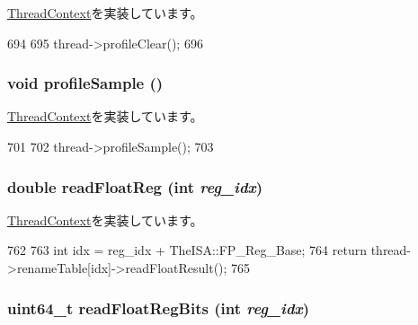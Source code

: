 \hyperlink{classThreadContext_ac9ebb698bd789f38c55af10256aab7e8}{ThreadContext}を実装しています。


\begin{DoxyCode}
694 {
695     thread->profileClear();
696 }
\end{DoxyCode}
\hypertarget{classOzoneCPU_1_1OzoneTC_aba547b904bdcf83196f983f79d285caf}{
\subsubsection[{profileSample}]{\setlength{\rightskip}{0pt plus 5cm}void profileSample ()}}
\label{classOzoneCPU_1_1OzoneTC_aba547b904bdcf83196f983f79d285caf}


\hyperlink{classThreadContext_a46e9ef08695527c8b4bd0e668bced5a8}{ThreadContext}を実装しています。


\begin{DoxyCode}
701 {
702     thread->profileSample();
703 }
\end{DoxyCode}
\hypertarget{classOzoneCPU_1_1OzoneTC_a34ccc34c22b261f80e9b0d0803aac24b}{
\subsubsection[{readFloatReg}]{\setlength{\rightskip}{0pt plus 5cm}double readFloatReg (int {\em reg\_\-idx})}}
\label{classOzoneCPU_1_1OzoneTC_a34ccc34c22b261f80e9b0d0803aac24b}


\hyperlink{classThreadContext_a7883083f396dee2160e4b8640d02f5f6}{ThreadContext}を実装しています。


\begin{DoxyCode}
762 {
763     int idx = reg_idx + TheISA::FP_Reg_Base;
764     return thread->renameTable[idx]->readFloatResult();
765 }
\end{DoxyCode}
\hypertarget{classOzoneCPU_1_1OzoneTC_a0d251dc1da1814673c7548cf46caf6ca}{
\subsubsection[{readFloatRegBits}]{\setlength{\rightskip}{0pt plus 5cm}uint64\_\-t readFloatRegBits (int {\em reg\_\-idx})}}
\label{classOzoneCPU_1_1OzoneTC_a0d251dc1da1814673c7548cf46caf6ca}


